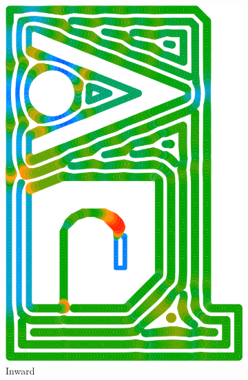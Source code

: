 \begin{figure}
\begin{subfigure}{\figwidth}
\includegraphics[width=\columnwidth]{sources/validation/gMAT_example/TEST_InwardDistributed_widths.png}
\caption{Inward}\label{TEST_InwardDistributed_accuracy}
\end{subfigure}
\begin{subfigure}{.04\columnwidth}\centering
\vspace{4cm}

\end{subfigure}
\end{figure}
